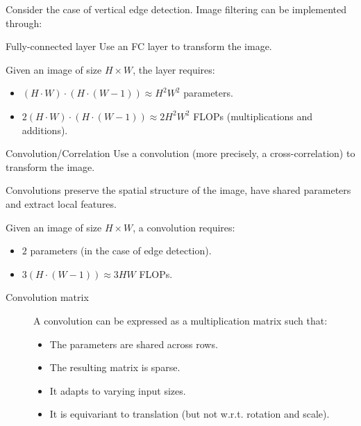 Consider the case of vertical edge detection.
Image filtering can be implemented through:
\begin{descriptionlist}
    \item[Fully-connected layer] 
        Use an FC layer to transform the image.

        Given an image of size $H \times W$, the layer requires:
        \begin{itemize}
            \item $(H \cdot W) \cdot (H \cdot (W-1)) \approx H^2W^2$ parameters.
            \item $2 (H \cdot W) \cdot (H \cdot (W-1)) \approx 2H^2W^2$ FLOPs (multiplications and additions).
        \end{itemize}

    \item[Convolution/Correlation] 
        Use a convolution (more precisely, a cross-correlation) to transform the image.

        \begin{remark}
            Convolutions preserve the spatial structure of the image, have shared parameters and extract local features.
        \end{remark}

        Given an image of size $H \times W$, a convolution requires:
        \begin{itemize}
            \item $2$ parameters (in the case of edge detection).
            \item $3 (H \cdot (W-1)) \approx 3HW$ FLOPs.
        \end{itemize}

        \begin{description}
            \item[Convolution matrix] 
                A convolution can be expressed as a multiplication matrix such that:
                \begin{itemize}
                    \item The parameters are shared across rows.
                    \item The resulting matrix is sparse.
                    \item It adapts to varying input sizes.
                    \item It is equivariant to translation (but not w.r.t. rotation and scale).
                \end{itemize}


\end{description}
\end{descriptionlist}
